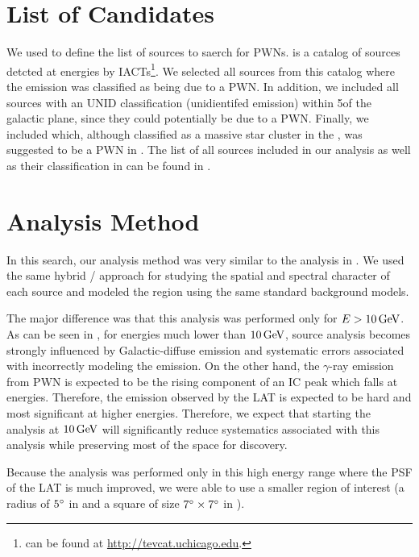 \section{List of \tev {} Candidates}



We used \tevcat to define the list of \tev sources to saerch for \gev
\acp{PWN}. \tevcat is a catalog of sources detcted at \tev energies by 
\acp{IACT}\footnote{\tevcat can be found at \url{http://tevcat.uchicago.edu}.}.
We selected all sources from this catalog 
where the emission was classified as being
due to a \ac{PWN}. In addition, we included all sources with an UNID classification
(unidientifed emission) within 5\degree of the galactic plane, since they
could potentially be due to a \ac{PWN}.
Finally, we included  which, although classified as a
massive star cluster in the \tevcat, was suggested to be a \ac{PWN} in 
\cite{de-naurois_2013a_galactic-h.e.s.s.}. The list of all sources
included in our analysis as well as their classification in \tevcat
can be found in .

\section{Analysis Method}

In this search, our analysis method was very similar to the analysis
in . We used the same hybrid \pointlike/\gtlike
approach for studying the spatial and spectral character of each source
and modeled the region using the same standard background models.

The major difference was that this analysis
was performed only for $E>10\,\text{GeV}$.  As can be seen in
, for energies much lower than $10\,\text{GeV}$,
source analysis becomes strongly influenced by Galactic-diffuse
emission and systematic errors associated with incorrectly modeling
the emission. On the other hand, the $\gamma$-ray emission from \ac{PWN}
is expected to be the rising component of an \ac{IC} peak which falls
at \tev energies. Therefore, the emission observed by the \ac{LAT} is
expected to be hard and most significant at higher energies. Therefore,
we expect that starting the analysis  at $10\,\text{GeV}$ will
significantly reduce systematics associated with this analysis while
preserving most of the space for discovery.

Because the analysis was performed only in this high energy range where
the \ac{PSF} of the \ac{LAT} is much improved, we were able to use
a smaller region of interest (a radius of $5^\circ$ in \pointlike 
and a square of size $7^\circ\times7^\circ$ in \gtlike).


